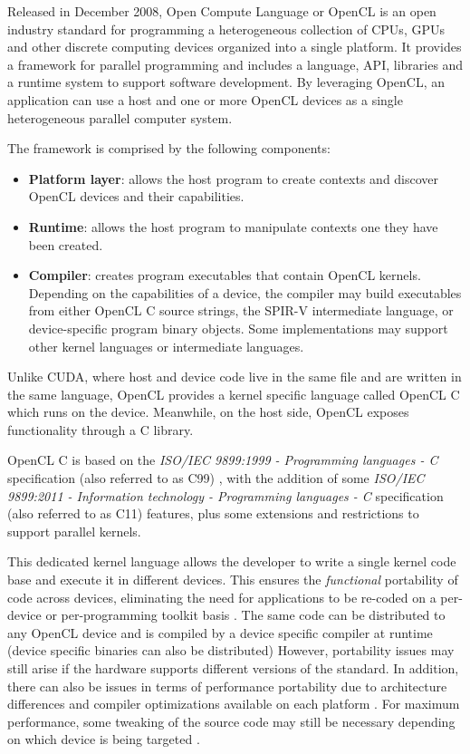 Released in December 2008, Open Compute Language or OpenCL \cite{opencl_spec} is an open industry standard for programming a heterogeneous collection of CPUs, GPUs and other discrete computing devices organized into a single platform. It provides a framework for parallel programming and includes a language, API, libraries and a runtime system to support software development. By leveraging OpenCL, an application can use a host and one or more OpenCL devices as a single heterogeneous parallel computer system.

The framework is comprised by the following components:
\begin{itemize}
    \item \textbf{Platform layer}: allows the host program to create contexts and discover OpenCL devices and their capabilities.
    \item \textbf{Runtime}: allows the host program to manipulate contexts one they have been created.
    \item \textbf{Compiler}: creates program executables that contain OpenCL kernels. Depending on the capabilities of a device, the compiler may build executables from either OpenCL C source strings, the SPIR-V intermediate language, or device-specific program binary objects. Some implementations may support other kernel languages or intermediate languages.
\end{itemize}

Unlike CUDA, where host and device code live in the same file and are written in the same language, OpenCL provides a kernel specific language called OpenCL C \cite{opencl_c_spec} which runs on the device. Meanwhile, on the host side, OpenCL exposes functionality through a C library.

OpenCL C is based on the \textit{ISO/IEC 9899:1999 - Programming languages - C} specification (also referred to as C99) \cite{c99}, with the addition of some \textit{ISO/IEC 9899:2011 - Information technology - Programming languages - C} specification (also referred to as C11) \cite{c11} features, plus some extensions and restrictions to support parallel kernels.

This dedicated kernel language allows the developer to write a single kernel code base and execute it in different devices. This ensures the \textit{functional} portability of code across devices, eliminating the need for applications to be re-coded on a per-device or per-programming toolkit basis \cite{performance_portability_2013}. The same code can be distributed to any OpenCL device and is compiled by a device specific compiler at runtime (device specific binaries can also be distributed) However, portability issues may still arise if the hardware supports different versions of the standard. In addition, there can also be issues in terms of performance portability due to architecture differences and compiler optimizations available on each platform \cite{performance_portability_2013, performance_portability_2019, performance_portability_2020}. For maximum performance, some tweaking of the source code may still be necessary depending on which device is being targeted \cite{optimizing_opencl_fpga_integer, optimizing_opencl_fpga_automata}.

